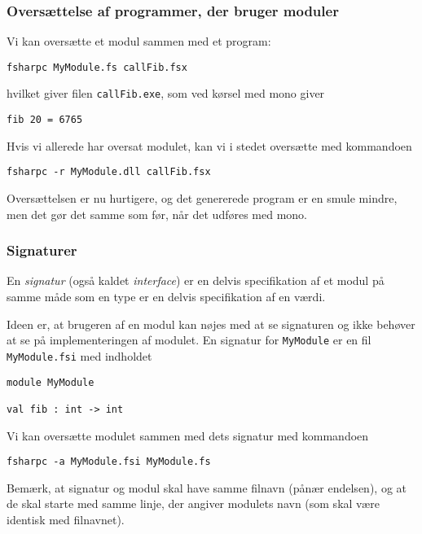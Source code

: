 \documentclass{beamer}
\begin{document}
\begin{frame}%
\frametitle{Oversættelse af programmer, der bruger moduler}

Vi kan oversætte et modul sammen med et program:

\vspace{1ex}
\texttt{fsharpc MyModule.fs callFib.fsx}

\vspace{1ex}
hvilket giver filen \texttt{callFib.exe}, som ved kørsel med mono
giver

\vspace{1ex}
\texttt{fib 20 = 6765}

\vspace{1ex}
Hvis vi allerede har oversat modulet, kan vi i stedet oversætte med kommandoen

\vspace{1ex}
\texttt{fsharpc -r MyModule.dll callFib.fsx}

\vspace{1ex} Oversættelsen er nu hurtigere, og det genererede program er
en smule mindre, men det gør det samme som før, når det udføres med mono.

\end{frame}

\begin{frame}[fragile=singleslide]
\frametitle{Signaturer}

En \emph{signatur} (også kaldet \emph{interface}) er en delvis specifikation
af et modul på samme måde som en type er en delvis specifikation af en værdi.

Ideen er, at brugeren af en modul kan nøjes med at se signaturen og
ikke behøver at se på implementeringen af modulet.  En  signatur for
\texttt{MyModule} er en fil \texttt{MyModule.fsi} med indholdet

\renewcommand{\baselinestretch}{0.82}
{\small
\begin{verbatim}
module MyModule

val fib : int -> int
\end{verbatim}
}
\renewcommand{\baselinestretch}{1.0}

Vi kan oversætte modulet sammen med dets signatur med kommandoen

\renewcommand{\baselinestretch}{0.82}
{\small
\begin{verbatim}
fsharpc -a MyModule.fsi MyModule.fs
\end{verbatim}
}
\renewcommand{\baselinestretch}{1.0}

Bemærk, at signatur og modul skal have samme filnavn (pånær endelsen),
og at de skal starte med samme linje, der angiver modulets navn (som
skal være identisk med filnavnet).

\end{frame}
\end{document}
